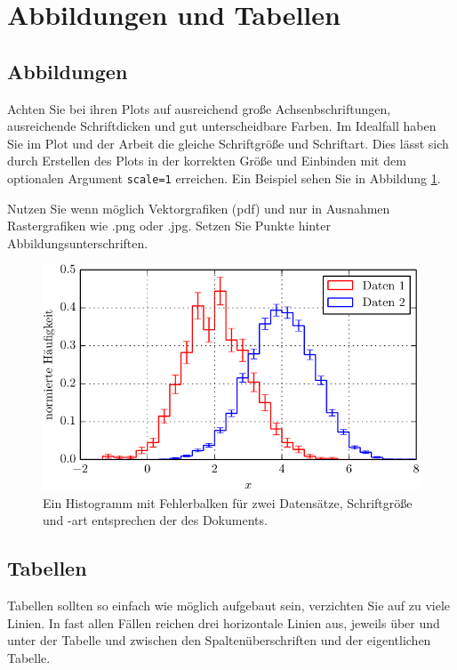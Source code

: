 \section{Abbildungen und Tabellen}

\subsection{Abbildungen}

Achten Sie bei ihren Plots auf ausreichend große Achsenbschriftungen, ausreichende Schriftdicken und gut unterscheidbare Farben.
Im Idealfall haben Sie im Plot und der Arbeit die gleiche Schriftgröße und Schriftart.
Dies lässt sich durch Erstellen des Plots in der korrekten Größe und Einbinden mit dem optionalen Argument \texttt{scale=1} erreichen. Ein Beispiel sehen Sie in Abbildung \ref{fig:bsp}.

Nutzen Sie wenn möglich Vektorgrafiken (pdf) und nur in Ausnahmen Rastergrafiken wie .png oder .jpg.
Setzen Sie Punkte hinter Abbildungsunterschriften.

\begin{figure}
    \centering
    \includegraphics[scale=1]{./Plots/Histogramm.pdf}
    \caption{Ein Histogramm mit Fehlerbalken für zwei Datensätze, Schriftgröße und -art entsprechen der des Dokuments.}
    \label{fig:bsp}
\end{figure}

\subsection{Tabellen}

Tabellen sollten so einfach wie möglich aufgebaut sein, verzichten Sie auf zu viele Linien. In fast allen Fällen reichen drei horizontale Linien aus, jeweils über und unter der Tabelle und zwischen den Spaltenüberschriften und der eigentlichen Tabelle.

